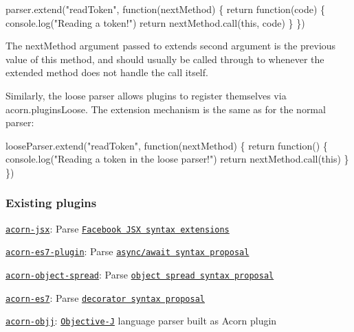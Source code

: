 \begin{DoxyCode}
parser.extend("readToken", function(nextMethod) \{
  return function(code) \{
    console.log("Reading a token!")
    return nextMethod.call(this, code)
  \}
\})
\end{DoxyCode}


The {\ttfamily next\+Method} argument passed to {\ttfamily extend}\textquotesingle{}s second argument is the previous value of this method, and should usually be called through to whenever the extended method does not handle the call itself.

Similarly, the loose parser allows plugins to register themselves via {\ttfamily acorn.\+plugins\+Loose}. The extension mechanism is the same as for the normal parser\+:


\begin{DoxyCode}
looseParser.extend("readToken", function(nextMethod) \{
  return function() \{
    console.log("Reading a token in the loose parser!")
    return nextMethod.call(this)
  \}
\})
\end{DoxyCode}


\subsubsection*{Existing plugins}


\begin{DoxyItemize}
\item \href{https://github.com/RReverser/acorn-jsx}{\tt {\ttfamily acorn-\/jsx}}\+: Parse \href{https://github.com/facebook/jsx}{\tt Facebook J\+SX syntax extensions}
\item \href{https://github.com/MatAtBread/acorn-es7-plugin/}{\tt {\ttfamily acorn-\/es7-\/plugin}}\+: Parse \href{https://github.com/tc39/ecmascript-asyncawait}{\tt async/await syntax proposal}
\item \href{https://github.com/UXtemple/acorn-object-spread}{\tt {\ttfamily acorn-\/object-\/spread}}\+: Parse \href{https://github.com/sebmarkbage/ecmascript-rest-spread}{\tt object spread syntax proposal}
\item \href{https://www.npmjs.com/package/acorn-es7}{\tt {\ttfamily acorn-\/es7}}\+: Parse \href{https://github.com/wycats/javascript-decorators}{\tt decorator syntax proposal}
\item \href{https://www.npmjs.com/package/acorn-objj}{\tt {\ttfamily acorn-\/objj}}\+: \href{http://www.cappuccino-project.org/learn/objective-j.html}{\tt Objective-\/J} language parser built as Acorn plugin 
\end{DoxyItemize}